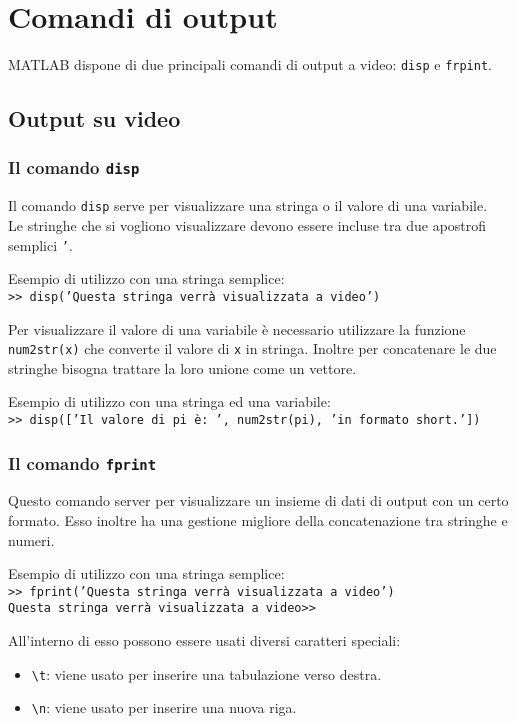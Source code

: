 \chapter{Comandi di output}
MATLAB dispone di due principali comandi di output a video: \texttt{disp} e \texttt{frpint}.
\section{Output su video}
\subsection{Il comando \texttt{disp}}
Il comando \texttt{disp} serve per visualizzare una stringa o il valore di una variabile. \\
Le stringhe che si vogliono visualizzare devono essere incluse tra due apostrofi semplici \texttt{'}.
\break
			
Esempio di utilizzo con una stringa semplice: \\
\texttt{>> disp('Questa stringa verrà visualizzata a video')} 
\break
			
Per visualizzare il valore di una variabile è necessario utilizzare la funzione \texttt{num2str(x)} che converte il 
valore di \texttt{x} in stringa. Inoltre per concatenare le due stringhe bisogna trattare la loro unione come un 
vettore. 
\break
			
Esempio di utilizzo con una stringa ed una variabile: \\
\texttt{>> disp(['Il valore di pi è: ', num2str(pi), 'in formato short.'])}

\subsection{Il comando \texttt{fprint}}
Questo comando server per visualizzare un insieme di dati di output con un certo formato. Esso inoltre ha una gestione 
migliore della concatenazione tra stringhe e numeri.
\break
			
Esempio di utilizzo con una stringa semplice: \\
\texttt{>> fprint('Questa stringa verrà visualizzata a video')} \\
\texttt{Questa stringa verrà visualizzata a video>>}
\break
			
All'interno di esso possono essere usati diversi caratteri speciali:
\begin{itemize}
	\item	\texttt{\textbackslash t}: viene usato per inserire una tabulazione verso destra.
	\item	\texttt{\textbackslash n}: viene usato per inserire una nuova riga.
\end{itemize}

